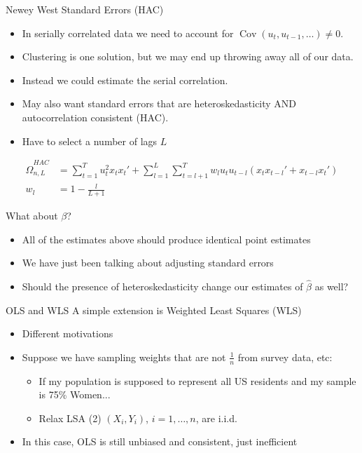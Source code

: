 \begin{frame}{Newey West Standard Errors (HAC)}
\begin{itemize}
\item In serially correlated data we need to account for $\operatorname{ Cov } (u_{t},u_{t-1},\ldots ) \neq 0$.
\item Clustering is one solution, but we may end up throwing away all of our data.
\item Instead we could estimate the serial correlation.
\item May also want standard errors that are \alert{heteroskedasticity AND autocorrelation consistent} (HAC).
\item Have to select a number of lags $L$
\end{itemize}
\begin{align*}
\widehat { \Omega } _ { n,L }^{HAC} &= \sum _ { t = 1 } ^ { T }  u _ { t }^2 x_t x_t'  + \sum_{l=1}^L \sum _ { t = l+1 } ^ { T } w_l u_t u _ { t-l } \left( x_t x_{t-l}' +  x_{t-l} x_{t}'  \right)\\
w_l &= 1 - \frac{l}{L+1}
\end{align*}
\end{frame}




\begin{frame}{What about $\beta$?}
\begin{itemize}
\item All of the estimates above should produce \alert{identical} point estimates
\item We have just been talking about adjusting \alert{standard errors}
\item Should the presence of heteroskedasticity change our estimates of $\widehat{\beta}$ as well?
\end{itemize}
\end{frame}



\begin{frame}{OLS and WLS}
A simple extension is Weighted Least Squares (WLS)
\begin{itemize}
\item Different motivations
\item Suppose we have sampling weights that are not $\frac{1}{n}$ from survey data, etc:
    \begin{itemize}
    \item If my population is supposed to represent all US residents and my sample is 75\% Women...
    \item Relax LSA (2) $(X_i,Y_i)$, $i =1,\ldots,n$, are i.i.d.
\end{itemize}
\item In this case, OLS is still unbiased and consistent, just \alert{inefficient}
\end{itemize}
\end{frame}

